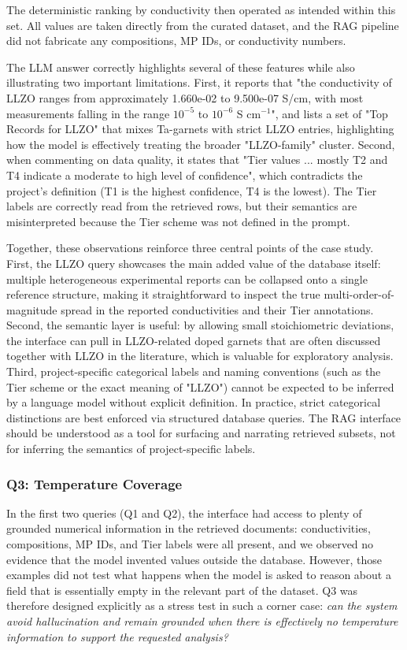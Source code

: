 \documentclass[a4paper,fleqn]{cas-sc}
\begin{document}
The deterministic ranking by conductivity then operated as intended within this set. All values are taken directly from the curated dataset, and the RAG pipeline did not fabricate any compositions, MP IDs, or conductivity numbers. 

The LLM answer correctly highlights several of these features while also illustrating two important limitations. First, it reports that "the conductivity of LLZO ranges from approximately 1.660e-02 to 9.500e-07 S/cm, with most measurements falling in the range $10^{-5}$ to $10^{-6}$ S cm$^{-1}$", and lists a set of "Top Records for LLZO" that mixes Ta-garnets with strict LLZO entries, highlighting how the model is effectively treating the broader "LLZO-family" cluster. Second, when commenting on data quality, it states that "Tier values ... mostly T2 and T4 indicate a moderate to high level of confidence", which contradicts the project's definition (T1 is the highest confidence, T4 is the lowest). The Tier labels are correctly read from the retrieved rows, but their semantics are misinterpreted because the Tier scheme was not defined in the prompt.

Together, these observations reinforce three central points of the case study. First, the LLZO query showcases the main added value of the database itself: multiple heterogeneous experimental reports can be collapsed onto a single reference structure, making it straightforward to inspect the true multi-order-of-magnitude spread in the reported conductivities and their Tier annotations. Second, the semantic layer is useful: by allowing small stoichiometric deviations, the interface can pull in LLZO-related doped garnets that are often discussed together with LLZO in the literature, which is valuable for exploratory analysis. Third, project-specific categorical labels and naming conventions (such as the Tier scheme or the exact meaning of "LLZO") cannot be expected to be inferred by a language model without explicit definition. In practice, strict categorical distinctions are best enforced via structured database queries. The RAG interface should be understood as a tool for surfacing and narrating retrieved subsets, not for inferring the semantics of project-specific labels.

\subsubsection{Q3: Temperature Coverage}\label{sec:q3}


In the first two queries (Q1 and Q2), the interface had access to plenty of grounded numerical information in the retrieved documents: conductivities, compositions, MP IDs, and Tier labels were all present, and we observed no evidence that the model invented values outside the database. However, those examples did not test what happens when the model is asked to reason about a field that is essentially empty in the relevant part of the dataset. Q3 was therefore designed explicitly as a stress test in such a corner case: \textit{can the system avoid hallucination and remain grounded when there is effectively no temperature information to support the requested analysis?}
\end{document}
